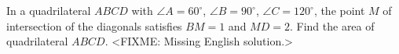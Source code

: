 \problem
In a quadrilateral $ABCD$ with $\angle A = 60^{\circ}$,
$\angle B = 90^{\circ}$, $\angle C = 120^{\circ}$, the point $M$ of
intersection of the diagonals satisfies $BM = 1$ and $MD = 2$.
Find the area of quadrilateral $ABCD$. 
\solution
<FIXME: Missing English solution.>
\endproblem
